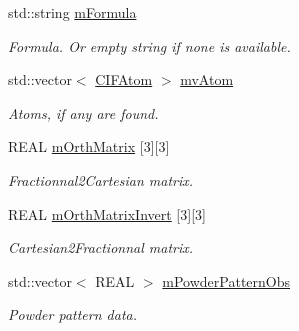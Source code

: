 \begin{DoxyCompactItemize}
\mbox{\label{class_obj_cryst_1_1_c_i_f_data_a128df79c59d0506958f49ae4ceab71f6}} 
std\+::string \mbox{\hyperlink{class_obj_cryst_1_1_c_i_f_data_a128df79c59d0506958f49ae4ceab71f6}{m\+Formula}}
\begin{DoxyCompactList}\small\item\em Formula. Or empty string if none is available. \end{DoxyCompactList}\item 
\mbox{\label{class_obj_cryst_1_1_c_i_f_data_a7319626ead0beb560cdd5e2f6429692a}} 
std\+::vector$<$ \mbox{\hyperlink{struct_obj_cryst_1_1_c_i_f_data_1_1_c_i_f_atom}{C\+I\+F\+Atom}} $>$ \mbox{\hyperlink{class_obj_cryst_1_1_c_i_f_data_a7319626ead0beb560cdd5e2f6429692a}{mv\+Atom}}
\begin{DoxyCompactList}\small\item\em Atoms, if any are found. \end{DoxyCompactList}\item 
\mbox{\label{class_obj_cryst_1_1_c_i_f_data_ab75a4932a2938e94b1c67c98e49a9868}} 
R\+E\+AL \mbox{\hyperlink{class_obj_cryst_1_1_c_i_f_data_ab75a4932a2938e94b1c67c98e49a9868}{m\+Orth\+Matrix}} \mbox{[}3\mbox{]}\mbox{[}3\mbox{]}
\begin{DoxyCompactList}\small\item\em Fractionnal2\+Cartesian matrix. \end{DoxyCompactList}\item 
\mbox{\label{class_obj_cryst_1_1_c_i_f_data_ab60c86af4b7ffa86f25cba46d9888d0e}} 
R\+E\+AL \mbox{\hyperlink{class_obj_cryst_1_1_c_i_f_data_ab60c86af4b7ffa86f25cba46d9888d0e}{m\+Orth\+Matrix\+Invert}} \mbox{[}3\mbox{]}\mbox{[}3\mbox{]}
\begin{DoxyCompactList}\small\item\em Cartesian2\+Fractionnal matrix. \end{DoxyCompactList}\item 
\mbox{\label{class_obj_cryst_1_1_c_i_f_data_aa49fc81a02613e9f46ced96d384db7d5}} 
std\+::vector$<$ R\+E\+AL $>$ \mbox{\hyperlink{class_obj_cryst_1_1_c_i_f_data_aa49fc81a02613e9f46ced96d384db7d5}{m\+Powder\+Pattern\+Obs}}
\begin{DoxyCompactList}\small\item\em Powder pattern data. \end{DoxyCompactList}\item 

\end{DoxyCompactItemize}
